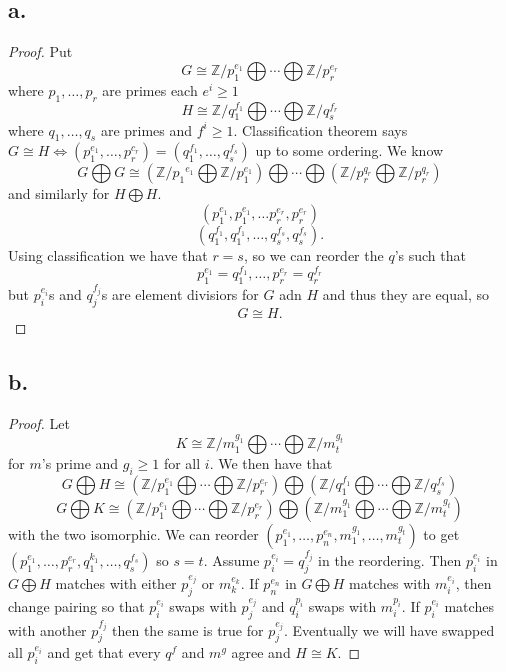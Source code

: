 \documentclass{article}
\begin{document}
\subsection*{a.}
\begin{proof}
    Put 
    \[
    G \cong \mathbb{Z}/p_1^{e_1} \bigoplus \cdots \bigoplus \mathbb{Z}/p_r^{e_r}    
    \]
    where $p_1, \ldots, p_r$ are primes each $e^i \geq 1$ 
    \[
    H \cong \mathbb{Z}/q_1^{f_1} \bigoplus \cdots \bigoplus \mathbb{Z}/q_s^{f_r}    
    \]
    where $q_1, \ldots , q_s$ are primes and $f^i \geq 1$. Classification theorem says $G \cong H \iff (p_1^{e_1}, \ldots , p_r^{c_r}) = (q_1^{f_1}, \ldots , q_s^{f_s})$ up to some ordering. We know 
    \[
    G \bigoplus G \cong \left(\mathbb{Z}/{p_1}^{e_1} \bigoplus \mathbb{Z}/p_1^{e_1} \right) \bigoplus \cdots \bigoplus \left(\mathbb{Z}/p_r^{q_r} \bigoplus \mathbb{Z}/p_r^{q_r} \right)
    \]
    and similarly for $H \bigoplus H$. \[
    (p_1^{e_1}, p_1^{e_1}, \ldots p_r^{e_r}, p_r^{e_r} )    
    \]
    \[
    (q_1^{f_1}, q_1^{f_1}, \ldots , q_s^{f_s}, q_s^{f_s}).    
    \]
    Using classification we have that $r = s$, so we can reorder the $q$'s such that  
    \[
    p_1^{e_1} = q_1^{f_1}, \ldots , p_r^{e_r} = q_r^{f_r}    
    \]
    but $p_i^{e_i}$s and $q_j^{f_j}$s are element divisiors for $G$ adn $H$ and thus they are equal, so 
    \[
    G \cong H.     
    \]
\end{proof}
\subsection*{b.}
\begin{proof}
    Let \[
    K \cong \mathbb{Z}/m_1^{g_1} \bigoplus \cdots \bigoplus \mathbb{Z}/m_t^{g_t}    
    \]
    for $m$'s prime and $g_i \geq 1$ for all $i$. We then have that 
    \[
    G \bigoplus H \cong \left(\mathbb{Z}/p_1^{e_1} \bigoplus \cdots \bigoplus \mathbb{Z}/p_r^{e_r} \right) \bigoplus \left( \mathbb{Z}/q_1^{f_1} \bigoplus \cdots \bigoplus \mathbb{Z}/q_s^{f_s} \right)     
    \]
    \[
       G \bigoplus K \cong \left(\mathbb{Z}/p_1^{e_1} \bigoplus \cdots \bigoplus \mathbb{Z}/p_r^{e_r} \right) \bigoplus \left(\mathbb{Z}/m_1^{g_1} \bigoplus \cdots \bigoplus \mathbb{Z}/m_t^{g_t}\right)
    \]
    with the two isomorphic. 
    We can reorder $(p_1^{e_1}, \ldots , p_n^{e_n}, m_1^{g_1}, \ldots , m_t^{g_t})$ to get $(p_1^{e_1}, \ldots , p_r^{e_r}, q_1^{k_1}, \ldots , q_s^{f_s})$ so $s = t$. 
    Assume $p_i^{e_i} = q_j^{f_j}$ in the reordering. Then $p_i^{e_i}$ in $G \bigoplus H$ matches with either $p_j^{e_j}$ or $m_k^{e_k}$. If $p_n^{e_n}$ in $G \bigoplus H$ matches with $m_i^{e_i}$, then change pairing so that $p_i^{e_i}$ swaps with $p_j^{e_j}$ and $q_i^{p_i}$ swaps with $m_i^{p_i}$. If $p_i^{e_i}$ matches with another $p_j^{f_j}$ then the same is true for $p_j^{e_j}$. Eventually we will have swapped all $p_i^{e_i}$ and get that every $q^f$ and $m^g$ agree and $H \cong K$. 
\end{proof}
\end{document}
